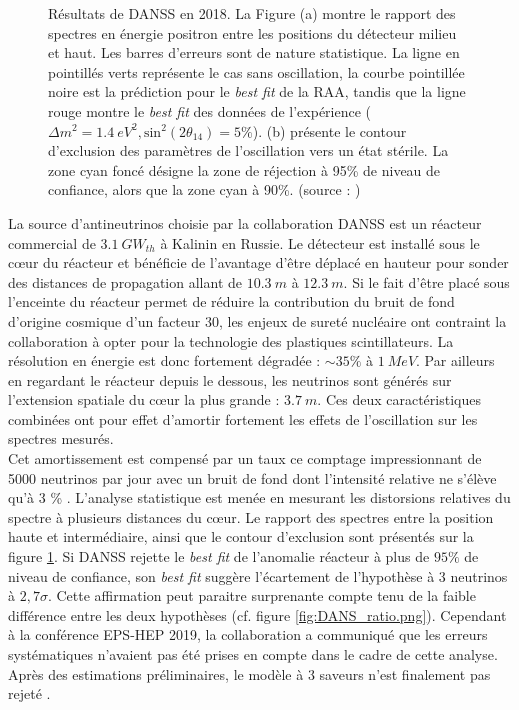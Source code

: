 {\begin{figure}[h!]
\caption[Résultats de DANSS en 2018]{Résultats de DANSS en 2018. La Figure (a) montre le rapport des spectres en énergie positron entre les positions du détecteur milieu et haut. Les barres d'erreurs sont de nature statistique. La ligne en pointillés verts représente le cas sans oscillation, la courbe pointillée noire est la prédiction pour le \textit{best fit} de la RAA, tandis que la ligne rouge montre le \textit{best fit} des données de l'expérience ($\Delta m^2 = \SI{1.4}{eV^2}, \textrm{sin}^2(2\theta_{14}) = 5\%$). (b) présente le contour d'exclusion des paramètres de l'oscillation vers un état stérile. La zone cyan foncé désigne la zone de réjection à 95\% de niveau de confiance, alors que la zone cyan à 90\%. (source : \cite{Alekseev:2018efk})}
\label{fig:DANSS_results}
\end{figure}

}

La source d'antineutrinos choisie par la collaboration DANSS est un réacteur commercial de $\SI{3.1}{GW_{th}}$ à Kalinin en Russie. Le détecteur est installé sous le c\oe ur du réacteur et bénéficie de l'avantage d'être déplacé en hauteur pour sonder des distances de propagation allant de $\SI{10.3}{m}$ à $\SI{12.3}{m}$. Si le fait d'être placé sous l'enceinte du réacteur permet de réduire la contribution du bruit de fond d'origine cosmique d'un facteur 30, les enjeux de sureté nucléaire ont contraint la collaboration à opter pour la technologie des plastiques scintillateurs. La résolution en énergie est donc fortement dégradée : $\sim 35\%$ à $\SI{1}{MeV}$. Par ailleurs en regardant le réacteur depuis le dessous, les neutrinos sont générés sur l'extension spatiale du c\oe ur la plus grande : $\SI{3.7}{m}$. Ces deux caractéristiques combinées ont pour effet d'amortir fortement les effets de l'oscillation sur les spectres mesurés.\\

Cet amortissement est compensé par un taux ce comptage impressionnant de 5000 neutrinos par jour avec un bruit de fond dont l'intensité relative ne s'élève qu'à 3 \% \cite{Alekseev:2018efk}. L'analyse statistique est menée en mesurant les distorsions relatives du spectre à plusieurs distances du c\oe ur. Le rapport des spectres entre la position haute et intermédiaire, ainsi que le contour d'exclusion sont présentés sur la figure \ref{fig:DANSS_results}. Si DANSS rejette le \textit{best fit} de l'anomalie réacteur à plus de $95 \%$ de niveau de confiance, son \textit{best fit} suggère l'écartement de l'hypothèse à 3 neutrinos à $2,7\sigma$. Cette affirmation peut paraitre surprenante compte tenu de la faible différence entre les deux hypothèses (cf. figure \ref{fig:DANS_ratio.png}). Cependant à la conférence EPS-HEP 2019, la collaboration a communiqué que les erreurs systématiques n'avaient pas été prises en compte dans le cadre de cette analyse. Après des estimations préliminaires, le modèle à 3 saveurs n'est finalement pas rejeté \cite{Danilov:EPSHEP2019}.

